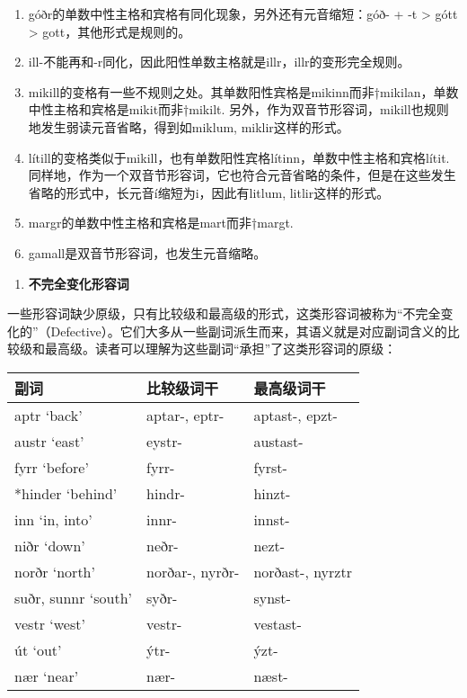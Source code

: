 \begin{enumerate}
\def\labelenumi{\alph{enumi})}
\item
  góðr的单数中性主格和宾格有同化现象，另外还有元音缩短：góð- + -t
  \textgreater{} gótt \textgreater{} gott，其他形式是规则的。
\item
  ill-不能再和-r同化，因此阳性单数主格就是illr，illr的变形完全规则。
\item
  mikill的变格有一些不规则之处。其单数阳性宾格是mikinn而非†mikilan，单数中性主格和宾格是mikit而非†mikilt.
  另外，作为双音节形容词，mikill也规则地发生弱读元音省略，得到如miklum,
  miklir这样的形式。
\item
  lítill的变格类似于mikill，也有单数阳性宾格lítinn，单数中性主格和宾格lítit.
  同样地，作为一个双音节形容词，它也符合元音省略的条件，但是在这些发生省略的形式中，长元音í缩短为i，因此有litlum,
  litlir这样的形式。
\item
  margr的单数中性主格和宾格是mart而非†margt.
\item
  gamall是双音节形容词，也发生元音缩略。
\end{enumerate}

\begin{enumerate}
\def\labelenumi{\arabic{enumi})}
\setcounter{enumi}{2}
\item
  \textbf{不完全变化形容词}
\end{enumerate}

一些形容词缺少原级，只有比较级和最高级的形式，这类形容词被称为``不完全变化的''（Defective）。它们大多从一些副词派生而来，其语义就是对应副词含义的比较级和最高级。读者可以理解为这些副词``承担''了这类形容词的原级：

\begin{longtable}{lll}
\toprule
副词 & 比较级词干 & 最高级词干 \\
\midrule
\endhead
\bottomrule
\endfoot
aptr `back' & aptar-, eptr- & aptast-, epzt- \\
austr `east‌' & eystr- & austast- \\
fyrr `before‌' & fyrr- & fyrst- \\
*hinder `behind' & hindr- & hinzt- \\
inn `in, into‌' & innr- & innst- \\
niðr `down' & neðr- & nezt- \\
norðr `north‌' & norðar-, nyrðr- & norðast-, nyrztr \\
suðr, sunnr `south' & syðr- & synst- \\
vestr `west' & vestr- & vestast- \\
út `out' & ýtr- & ýzt- \\
nær `near' & nær- & næst- \\
\end{longtable}

